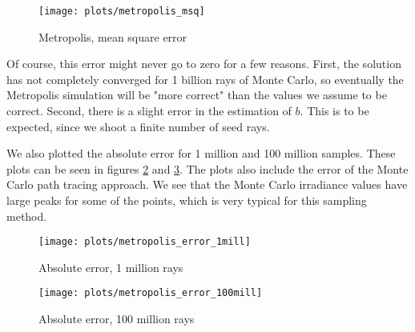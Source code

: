 \documentclass{article} %
\begin{document}
\begin{figure}
    \centering
    \texttt{[image: plots/metropolis\_msq]}\\
    \caption{Metropolis, mean square error}
    \label{fig:metropolis_msq}
\end{figure}

Of course, this error might never go to zero for a few reasons. First, the solution has not completely converged for 1 billion rays of Monte Carlo, so eventually the Metropolis simulation will be "more correct" than the values we assume to be correct. Second, there is a slight error in the estimation of $b$. This is to be expected, since we shoot a finite number of seed rays.

We also plotted the absolute error for 1 million and 100 million samples. These plots can be seen in figures \ref{fig:metropolis_error1} and \ref{fig:metropolis_error100}. The plots also include the error of the Monte Carlo path tracing approach. We see that the Monte Carlo irradiance values have large peaks for some of the points, which is very typical for this sampling method.

\begin{figure}
    \centering
    \texttt{[image: plots/metropolis\_error\_1mill]}\\
    \caption{Absolute error, 1 million rays}
    \label{fig:metropolis_error1}
\end{figure}

\begin{figure}
    \centering
    \texttt{[image: plots/metropolis\_error\_100mill]}\\
    \caption{Absolute error, 100 million rays}
    \label{fig:metropolis_error100}
\end{figure}
\end{document}
